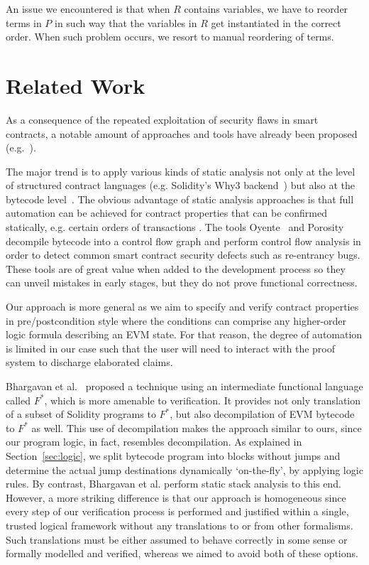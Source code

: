 \documentclass[sigplan,10pt]{acmart}\settopmatter{printfolios=true,printccs=false,printacmref=false}
\begin{document}
An issue we encountered is that when $R$ contains variables,
we have to reorder terms in $P$ in such way that the variables in $R$ get instantiated
in the correct order.
When such problem occurs, we resort to manual reordering of terms. %
%
\section{Related Work}
\label{sec:rwork}
%
As a consequence of the repeated exploitation of security flaws in smart contracts,
a notable amount of approaches and tools have already been proposed (e.g.~\cite{Bhargavan:2016:FVS:2993600.2993611,securify,Luu_COSH_16}).
 
The major trend is to apply various kinds of static analysis not only at the level of structured contract
languages (e.g. Solidity's Why3 backend~\cite{filliatre2013why3,Reitwiessner_16}) but also at the bytecode level~\cite{Msuiche_17,securify,Luu_COSH_16}. 
%
The obvious advantage of static analysis approaches is that full automation can be achieved for 
contract properties that can be confirmed statically, e.g. certain orders of transactions \cite{securify}.
The tools Oyente~\cite{Luu_COSH_16} and Porosity~\cite{Msuiche_17} decompile
bytecode into a control flow graph and perform control flow analysis in order
to detect common smart contract security defects such as re-entrancy bugs.
These tools are of great value when added to the development process so
they can unveil mistakes in early stages, but they do not prove functional correctness.

Our approach is more general as we aim to specify and verify contract properties in pre/postcondition
style where the conditions can comprise any higher-order logic formula describing an EVM state. 
For that reason, the degree of automation is limited in our case such that the user will need to interact 
with the proof system to discharge elaborated claims.

Bhargavan et al.~\cite{Bhargavan:2016:FVS:2993600.2993611} proposed a technique using an
intermediate functional language called $F^*$,
which is more amenable to verification. 
It provides not only translation of a subset of Solidity programs 
to $F^*$, but also decompilation of EVM bytecode to $F^*$ as well.
This use of decompilation makes
the approach similar to ours, since our program logic, in fact, resembles decompilation.
As explained in Section~\ref{sec:logic}, we split bytecode program into blocks without jumps
and determine the actual jump destinations dynamically `on-the-fly', by applying logic rules.
By contrast, Bhargavan et al. perform static stack analysis to this end.
However, a more striking difference is that our approach is homogeneous since every step of our verification process 
is performed and justified within a single, trusted logical framework without any translations to or from other formalisms.
Such translations must be either assumed to behave correctly in some sense or
formally modelled and verified, whereas we aimed to avoid both of these options.
\end{document}

